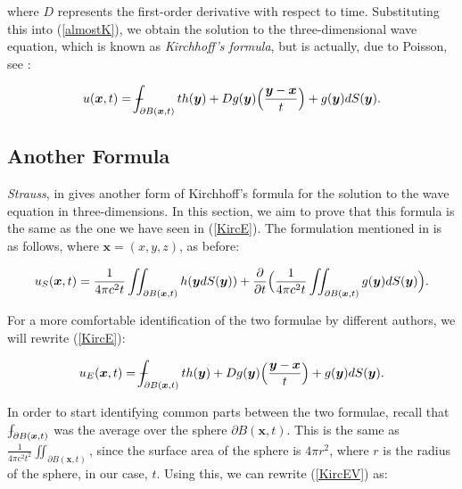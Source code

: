 \documentclass[a4paper, 12pt]{article}
\def\Xint#1{\mathchoice
{\XXint\displaystyle\textstyle{#1}}%
{\XXint\textstyle\scriptstyle{#1}}%
{\XXint\scriptstyle\scriptscriptstyle{#1}}%
{\XXint\scriptscriptstyle\scriptscriptstyle{#1}}%
\!\int}
\def\XXint#1#2#3{{\setbox0=\hbox{$#1{#2#3}{\int}$ }
\vcenter{\hbox{$#2#3$ }}\kern-.6\wd0}}
\def\dashint{\Xint-}
\numberwithin{equation}{section}
\begin{document}
where $D$ represents the first-order derivative with respect to time. Substituting this into (\ref{almostK}), we obtain the solution to the three-dimensional wave equation, which is known as \emph{Kirchhoff's formula}, but is 
actually, due to Poisson, see \cite{Str}:

\begin{equation} \label{KircE}
    u(\boldsymbol{x},t)=\dashint_{\partial B(\boldsymbol{x},t)} th(\boldsymbol{y})+Dg(\boldsymbol{y})\Big(\frac{\boldsymbol{y}-\boldsymbol{x}}{t}\Big)+g(\boldsymbol{y})dS(\boldsymbol{y}).
\end{equation}

\subsection{Another Formula}
\emph{Strauss}, in \cite{Str} gives another form of Kirchhoff's formula for the solution to the wave equation in three-dimensions. In this section, we aim to prove that 
this formula is the same as the one we have seen in (\ref{KircE}). The formulation mentioned in \cite{Str} is as follows, where $\boldsymbol{x}=(x,y,z)$, as before:

\begin{equation} \label{KircSTR}
    u_S(\boldsymbol{x}, t)=\frac{1}{4 \pi c^2 t}\iint_{\partial B(\boldsymbol{x}, t)} h(\boldsymbol{y}dS(\boldsymbol{y}))+\diffp[1]{}{t}\Big( \frac{1}{4 \pi c^2 t}\iint_{\partial B(\boldsymbol{x}, t)} g(\boldsymbol{y})dS(\boldsymbol{y})\Big).
\end{equation}

For a more comfortable identification of the two formulae by different authors, we will rewrite (\ref{KircE}): 

\begin{equation} \label{KircEV}
    u_E(\boldsymbol{x},t)=\dashint_{\partial B(\boldsymbol{x},t)} th(\boldsymbol{y})+Dg(\boldsymbol{y})\Big(\frac{\boldsymbol{y}-\boldsymbol{x}}{t}\Big)+g(\boldsymbol{y})dS(\boldsymbol{y}).
\end{equation}

In order to start identifying common parts between the two formulae, recall that $\dashint_{\partial B(\boldsymbol{x}, t)}$ was the average over the sphere $\partial B(\boldsymbol{x}, t)$.
This is the same as $\frac{1}{4 \pi c^2 t^2}\iint_{\partial B(\boldsymbol{x}, t)}$, since the surface area of the sphere is $4\pi r^2$, where $r$ is the radius of the sphere, 
in our case, $t$. Using this, we can rewrite (\ref{KircEV}) as:
\end{document}
